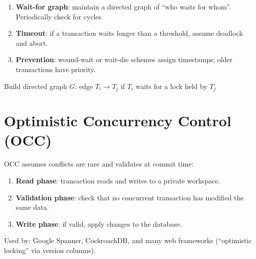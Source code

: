 \begin{enumerate}[nosep]
  \item \textbf{Wait-for graph}: maintain a directed graph of ``who waits for whom''.  Periodically check for cycles.
  \item \textbf{Timeout}: if a transaction waits longer than a threshold, assume deadlock and abort.
  \item \textbf{Prevention}: wound-wait or wait-die schemes assign timestamps; older transactions have priority.
\end{enumerate}

\begin{algorithm}[H]
\caption{Deadlock Detection via Wait-For Graph}
\label{alg:deadlock}
Build directed graph $G$: edge $T_i \to T_j$ if $T_i$ waits for a lock held by $T_j$\;
\end{algorithm}

\section{Optimistic Concurrency Control (OCC)}

OCC assumes conflicts are rare and validates at commit time:
\begin{enumerate}[nosep]
  \item \textbf{Read phase}: transaction reads and writes to a private workspace.
  \item \textbf{Validation phase}: check that no concurrent transaction has modified the same data.
  \item \textbf{Write phase}: if valid, apply changes to the database.
\end{enumerate}

Used by: Google Spanner, CockroachDB, and many web frameworks (``optimistic locking'' via version columns).


